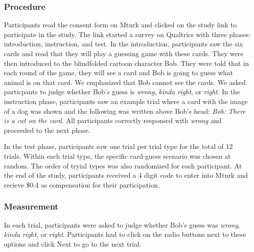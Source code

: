 \documentclass[10pt, letterpaper]{article}
\begin{document}
\subsubsection{Procedure}\label{procedure}

Participants read the consent form on Mturk and clicked on the study
link to participate in the study. The link started a survey on Qualtrics
with three phases: introduction, instruction, and test. In the
introduction, participants saw the six cards and read that they will
play a guessing game with these cards. They were then introduced to the
blindfolded cartoon character Bob. They were told that in each round of
the game, they will see a card and Bob is going to guess what animal is
on that card. We emphasized that Bob cannot see the cards. We asked
particpants to judge whether Bob's guess is \emph{wrong}, \emph{kinda
right}, or \emph{right}. In the instruction phase, participants saw an
example trial where a card with the image of a dog was shown and the
following was written above Bob's head: \emph{Bob: There is a cat on the
card}. All participants correctly responsed with \emph{wrong} and
proceeded to the next phase.

In the test phase, participants saw one trial per trial type for the
total of 12 trials. Within each trial type, the specific card-guess
scenario was chosen at random. The order of tryial types was also
randomized for each participant. At the end of the study, participants
received a 4 digit code to enter into Mturk and recieve \$0.4 as
compensation for their participation.

\subsubsection{Measurement}\label{measurement}

In each trial, participants were asked to judge whether Bob's guess was
\emph{wrong}, \emph{kinda right}, or \emph{right}. Participants had to
click on the radio buttons next to these options and click Next to go to
the next trial.
\end{document}
